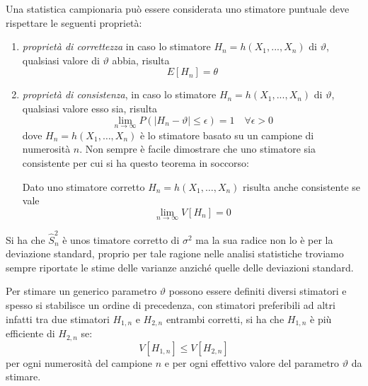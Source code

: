 \documentclass[a4paper,12pt, oneside]{book}
\begin{document}
Una statistica campionaria può essere considerata uno stimatore puntuale deve rispettare le seguenti proprietà:
\begin{enumerate}
    \item \emph{proprietà di correttezza} in caso lo stimatore $H_n=h(X_1,...,X_n)$ di $\vartheta$, 
          qualsiasi valore di $\vartheta$ abbia, risulta 
          \[ E[H_{n}] = \theta \]
    \item \emph{proprietà di consistenza}, in caso lo stimatore $H_n=h(X_1,...,X_n)$ di $\vartheta$,
          qualsiasi valore esso sia, risulta 
          \[ \lim_{n \rightarrow \infty} P(|H_n - \vartheta| \leq \epsilon) = 1 \quad \forall \epsilon > 0 \]
          dove $H_n = h(X_1, \dots, X_n)$ è lo stimatore basato su un campione di numerosità $n$.\newline
          Non sempre è facile dimostrare che uno stimatore sia consistente per cui si ha questo teorema in soccorso:
          \begin{teo}
              Dato uno stimatore corretto $H_n = h(X_1, \dots, X_n)$ risulta anche consistente se vale
              \[ \lim _{n \rightarrow \infty} V[H_n] = 0 \]
          \end{teo}
\end{enumerate}
Si ha che $\hat{S}_n^2$ è unos timatore corretto di $\sigma^2$ ma la sua radice non lo è per la deviazione standard,
proprio per tale ragione nelle analisi statistiche troviamo sempre riportate 
le stime delle varianze anziché quelle delle deviazioni standard.

Per stimare un generico parametro $\vartheta$ possono essere definiti diversi stimatori e spesso 
si stabilisce un ordine di precedenza, con stimatori preferibili ad altri infatti tra due stimatori
$H_{1,n}$ e $H_{2,n}$ entrambi corretti, si ha che $H_{1,n}$ è più efficiente di $H_{2,n}$ se:
\[ V\left[H_{1, n}\right] \leq V\left[H_{2, n}\right] \]
per ogni numerosità del campione $n$ e per ogni effettivo valore del parametro $\vartheta$ da stimare.
\end{document}
